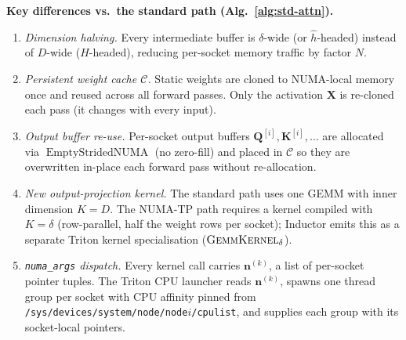 \documentclass{article}
\DeclareMathOperator{\EmptyNUMA}{EmptyStridedNUMA}
\newcommand{\numaargs}[1]{\mathbf{n}^{(#1)}}
\begin{document}
\bigskip\noindent
\textbf{Key differences vs.\ the standard path (Alg.~\ref{alg:std-attn}).}
\begin{enumerate}
  \item \textit{Dimension halving.}  Every intermediate buffer is $\delta$-wide (or
        $\hat{h}$-headed) instead of $D$-wide ($H$-headed), reducing per-socket memory
        traffic by factor $N$.
  \item \textit{Persistent weight cache $\mathcal{C}$.}  Static weights are cloned to
        NUMA-local memory once and reused across all forward passes.  Only the
        activation $\mathbf{X}$ is re-cloned each pass (it changes with every input).
  \item \textit{Output buffer re-use.}  Per-socket output buffers $\mathbf{Q}^{[i]},
        \mathbf{K}^{[i]}, \ldots$ are allocated via $\EmptyNUMA$ (no zero-fill) and
        placed in $\mathcal{C}$ so they are overwritten in-place each forward pass
        without re-allocation.
  \item \textit{New output-projection kernel.}  The standard path uses one GEMM with
        inner dimension $K=D$.  The NUMA-TP path requires a kernel compiled with
        $K=\delta$ (row-parallel, half the weight rows per socket); Inductor emits this
        as a separate Triton kernel specialisation
        ($\textsc{GemmKernel}_{\delta}$).
  \item \textit{\texttt{numa\_args} dispatch.}  Every kernel call carries
        $\numaargs{k}$, a list of per-socket pointer tuples.  The Triton CPU launcher
        reads $\numaargs{k}$, spawns one thread group per socket with CPU affinity
        pinned from \texttt{/sys/devices/system/node/node$i$/cpulist}, and supplies
        each group with its socket-local pointers.
\end{enumerate}
\end{document}
